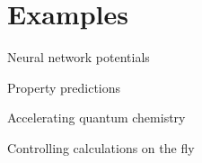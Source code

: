 \section{Examples}
\begin{frame}[t]{Neural network potentials}

\end{frame}
\begin{frame}[t]{Property predictions}

\end{frame}
\begin{frame}[t]{Accelerating quantum chemistry}

\end{frame}
\begin{frame}[t]{Controlling calculations on the fly}

\end{frame}
